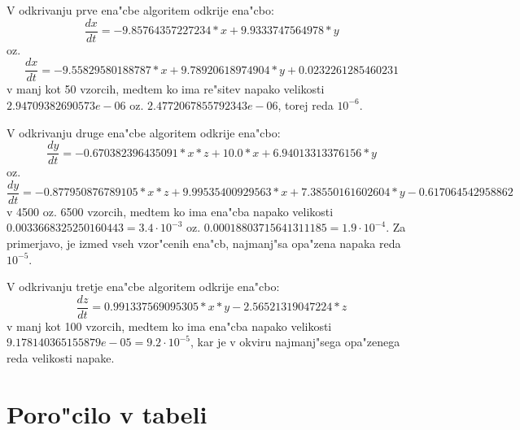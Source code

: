\documentclass[10pt,a4paper]{article}
\begin{document}
V odkrivanju prve ena"cbe algoritem odkrije ena"cbo: 
$$\frac{dx}{dt} = -9.85764357227234*x + 9.9333747564978*y$$  
oz. $$\frac{dx}{dt} = -9.55829580188787*x + 9.78920618974904*y + 0.0232261285460231$$
v manj kot 50 vzorcih, medtem ko ima re"sitev napako velikosti
$2.94709382690573e-06$ oz. $2.4772067855792343e-06$, torej reda $10^{-6}$.

V odkrivanju druge ena"cbe algoritem odkrije ena"cbo:
$$ \frac{dy}{dt} = -0.670382396435091*x*z + 10.0*x + 6.94013313376156*y $$
oz. $$ \frac{dy}{dt} = -0.877950876789105*x*z + 9.99535400929563*x + 7.38550161602604*y - 0.617064542958862 $$ 
v 4500 oz. 6500 vzorcih, medtem ko ima ena"cba napako velikosti
$0.0033668325250160443 = 3.4\cdot 10^ {-3}$ oz. $0.00018803715641311185 = 1.9\cdot 10^ {-4}$.
Za primerjavo, je izmed vseh vzor"cenih ena"cb, najmanj"sa opa"zena napaka
reda $10^ {-5}$.

V odkrivanju tretje ena"cbe algoritem odkrije ena"cbo: 
$$\frac{dz}{dt} = 0.991337569095305*x*y - 2.56521319047224*z$$ 
v manj kot 100 vzorcih, medtem ko ima ena"cba napako velikosti
$9.178140365155879e-05 = 9.2\cdot 10^ {-5}$,
kar je v okviru najmanj"sega opa"zenega reda velikosti napake.

\pagebreak
\section{Poro"cilo v tabeli}
\end{document}
